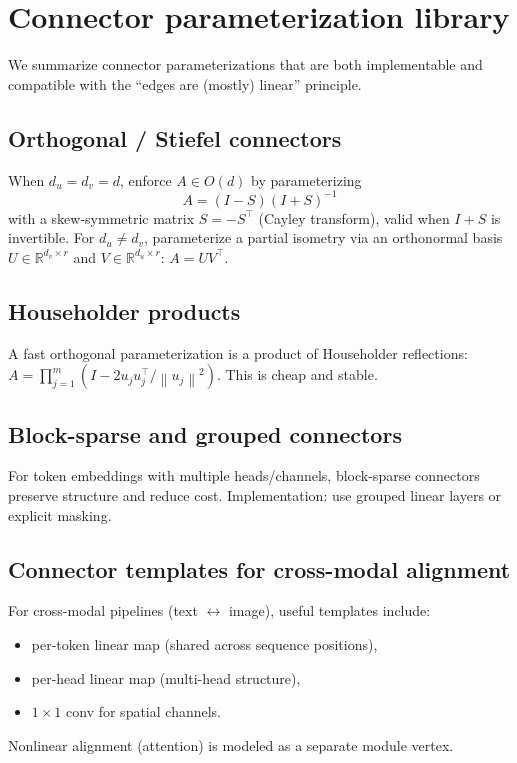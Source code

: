 \documentclass[11pt]{article}
\theoremstyle{definition}
\theoremstyle{plain}
\theoremstyle{remark}
\newcommand{\R}{\mathbb{R}}
\newcommand{\norm}[1]{\left\lVert #1 \right\rVert}
\begin{document}
\section{Connector parameterization library}
\label{app:connectors-lib}

We summarize connector parameterizations that are both implementable and compatible with the ``edges are (mostly) linear'' principle.

\subsection{Orthogonal / Stiefel connectors}
When $d_u=d_v=d$, enforce $A\in O(d)$ by parameterizing
\[
A = (I-S)(I+S)^{-1}
\]
with a skew-symmetric matrix $S=-S^\top$ (Cayley transform), valid when $I+S$ is invertible.
For $d_u\neq d_v$, parameterize a partial isometry via an orthonormal basis $U\in\R^{d_v\times r}$ and $V\in\R^{d_u\times r}$:
$A=UV^\top$.

\subsection{Householder products}
A fast orthogonal parameterization is a product of Householder reflections:
$A=\prod_{j=1}^m (I-2 u_j u_j^\top/\norm{u_j}^2)$.
This is cheap and stable.

\subsection{Block-sparse and grouped connectors}
For token embeddings with multiple heads/channels, block-sparse connectors preserve structure and reduce cost.
Implementation: use grouped linear layers or explicit masking.

\subsection{Connector templates for cross-modal alignment}
For cross-modal pipelines (text $\leftrightarrow$ image), useful templates include:
\begin{itemize}[leftmargin=2em]
\item per-token linear map (shared across sequence positions),
\item per-head linear map (multi-head structure),
\item $1\times 1$ conv for spatial channels.
\end{itemize}
Nonlinear alignment (attention) is modeled as a separate module vertex.
\end{document}
